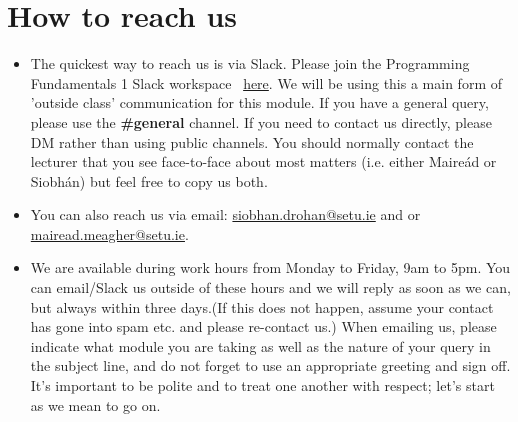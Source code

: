 \documentclass{article}
\begin{document}
\section{How to reach us}
\begin{itemize}
    \item The quickest way to reach us  is via Slack. Please join the Programming Fundamentals 1 Slack workspace \ \href{https://join.slack.com/t/progfund2022-2023/shared_invite/zt-1g4rdcb3r-kbRw3StjvNQ3EqaA3Mdz_g}{here}. 
    We  will be using this a main form of 'outside class' communication for this module. If you have a general query, please use the \textbf{\#general} channel. 
    If you need to contact us directly, please DM rather than using public channels. You should  normally contact the lecturer that you see face-to-face about most matters (i.e. either Maire\'ad or Siobh\'an) but feel free to copy us both. 
    \item You can also reach us  via email: \href{mailto:siobhan.drohan@setu.ie}{siobhan.drohan@setu.ie}   and or \href{mailto:mairead.meagher@setu.ie}{mairead.meagher@setu.ie}. 
    \item We are available during work hours from Monday to Friday, 9am to 5pm. You can email/Slack us outside of these hours and we will reply as soon as we can, 
but always within three days.(If this does not happen, assume your contact has gone into spam etc. and please re-contact us.) When emailing us, please indicate what module you are taking as well as the nature of your query in the 
subject line, and do not forget to use an appropriate greeting and sign off. It’s important to be polite and to treat one another with 
respect; let’s start as we mean to go on.
   
\end{itemize}
\pagebreak
\end{document}
